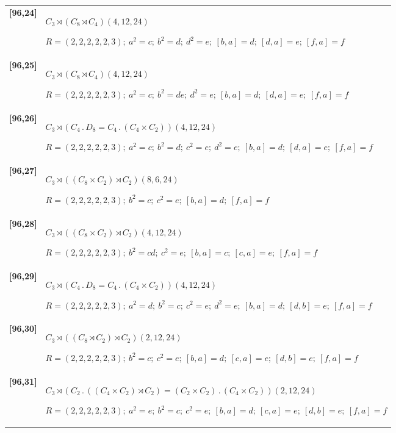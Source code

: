 \documentclass[UTF8,fontset=fandol,11pt,a4paper]{ctexart}
\begin{document}
\begin{longtable}{@{}p{17mm}>{\raggedright\arraybackslash}p{141mm}@{}}
\textbf{[96,24]} & $C_{3}\rtimes (C_{8}\rtimes C_{4})$\quad $(4,12,24)$\par\(R=(2,2,2,2,2,3);\allowbreak\ a^{2}=c;\allowbreak\ b^{2}=d;\allowbreak\ d^{2}=e;\allowbreak\ [b,a]=d;\allowbreak\ [d,a]=e;\allowbreak\ [f,a]=f\)\\[3pt]

\textbf{[96,25]} & $C_{3}\rtimes (C_{8}\rtimes C_{4})$\quad $(4,12,24)$\par\(R=(2,2,2,2,2,3);\allowbreak\ a^{2}=c;\allowbreak\ b^{2}=de;\allowbreak\ d^{2}=e;\allowbreak\ [b,a]=d;\allowbreak\ [d,a]=e;\allowbreak\ [f,a]=f\)\\[3pt]

\textbf{[96,26]} & $C_{3}\rtimes (C_{4}\mathbin{.} D_{8} = C_{4}\mathbin{.} (C_{4}\times C_{2}))$\quad $(4,12,24)$\par\(R=(2,2,2,2,2,3);\allowbreak\ a^{2}=c;\allowbreak\ b^{2}=d;\allowbreak\ c^{2}=e;\allowbreak\ d^{2}=e;\allowbreak\ [b,a]=d;\allowbreak\ [d,a]=e;\allowbreak\ [f,a]=f\)\\[3pt]

\textbf{[96,27]} & $C_{3}\rtimes ((C_{8}\times C_{2})\rtimes C_{2})$\quad $(8,6,24)$\par\(R=(2,2,2,2,2,3);\allowbreak\ b^{2}=c;\allowbreak\ c^{2}=e;\allowbreak\ [b,a]=d;\allowbreak\ [f,a]=f\)\\[3pt]

\textbf{[96,28]} & $C_{3}\rtimes ((C_{8}\times C_{2})\rtimes C_{2})$\quad $(4,12,24)$\par\(R=(2,2,2,2,2,3);\allowbreak\ b^{2}=cd;\allowbreak\ c^{2}=e;\allowbreak\ [b,a]=c;\allowbreak\ [c,a]=e;\allowbreak\ [f,a]=f\)\\[3pt]

\textbf{[96,29]} & $C_{3}\rtimes (C_{4}\mathbin{.} D_{8} = C_{4}\mathbin{.} (C_{4}\times C_{2}))$\quad $(4,12,24)$\par\(R=(2,2,2,2,2,3);\allowbreak\ a^{2}=d;\allowbreak\ b^{2}=c;\allowbreak\ c^{2}=e;\allowbreak\ d^{2}=e;\allowbreak\ [b,a]=d;\allowbreak\ [d,b]=e;\allowbreak\ [f,a]=f\)\\[3pt]

\textbf{[96,30]} & $C_{3}\rtimes ((C_{8}\rtimes C_{2})\rtimes C_{2})$\quad $(2,12,24)$\par\(R=(2,2,2,2,2,3);\allowbreak\ b^{2}=c;\allowbreak\ c^{2}=e;\allowbreak\ [b,a]=d;\allowbreak\ [c,a]=e;\allowbreak\ [d,b]=e;\allowbreak\ [f,a]=f\)\\[3pt]

\textbf{[96,31]} & $C_{3}\rtimes (C_{2}\mathbin{.} ((C_{4}\times C_{2})\rtimes C_{2}) = (C_{2}\times C_{2})\mathbin{.} (C_{4}\times C_{2}))$\quad $(2,12,24)$\par\(R=(2,2,2,2,2,3);\allowbreak\ a^{2}=e;\allowbreak\ b^{2}=c;\allowbreak\ c^{2}=e;\allowbreak\ [b,a]=d;\allowbreak\ [c,a]=e;\allowbreak\ [d,b]=e;\allowbreak\ [f,a]=f\)\\[3pt]


\end{longtable}
\end{document}
